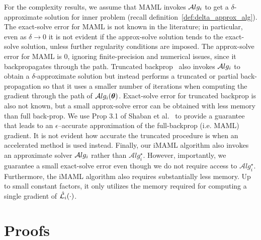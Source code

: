 \documentclass{article} \usepackage[nonatbib, final]{mod_neurips}
\newcommand{\prior}{{\bm{\theta}}}               \newcommand{\priorspace}{\Theta}
\newcommand{\algstar}{\mathcal{A}lg^\star}
\begin{document}
For the complexity results, we assume that MAML invokes $\mathcal{A}lg_i$ to get a $\delta$-approximate solution for inner problem (recall definition~\ref{def:delta_approx_alg}). The exact-solve
error for MAML is not known in the literature; in particular, even as
$\delta\rightarrow 0$ it is not evident if the approx-solve solution
tends to the exact-solve solution, unless further regularity
conditions are imposed. The approx-solve error for MAML is $0$,
ignoring finite-precision and numerical issues, since it
backpropagates through the path. Truncated
backprop~\cite{Shaban2018TruncatedBF} also invokes $\mathcal{A}lg_i$ to obtain a $\delta$-approximate solution but instead performs a truncated or partial back-propagation so that it uses a smaller number of
iterations when computing the gradient through the path of
$\alg_i(\prior)$. Exact-solve error for truncated backprop is also not
known, but a small approx-solve error can be obtained with less memory
than full back-prop. We use Prop 3.1 of Shaban et al.~\cite{Shaban2018TruncatedBF} to provide a guarantee that leads to an
$\epsilon$--accurate approximation of the full-backprop (i.e. MAML)
gradient. It is not evident how accurate the truncated procedure is
when an accelerated method is used instead. Finally, our iMAML
algorithm also invokes an approximate solver $\mathcal{A}lg_i$ rather than $\algstar_i$. However, importantly, we guarantee a
small exact-solve error even though we do not require access to
$\algstar_i$. Furthermore, the iMAML algorithm also requires substantially less
memory. Up to small constant factors, it only utilizes the memory required for computing a single
gradient of $\hat{\mathcal{L}}_i(\cdot)$.


\section{Proofs}
\end{document}
